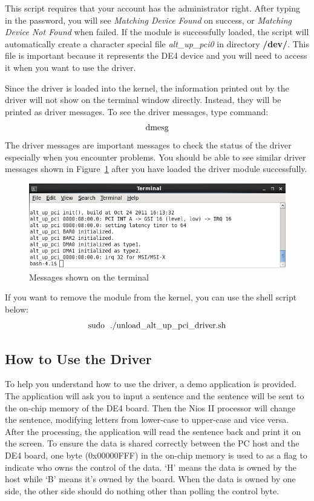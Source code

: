 \documentclass[11pt, twoside, pdftex]{article}
\begin{document}
This script requires that your account has the administrator right. After typing in the password, you will see {\it Matching Device Found} on success, or {\it Matching Device Not Found} when failed. If the module is successfully loaded, the script will automatically create a character special file {\it alt\_up\_pci0} in directory {\bf /dev/}. This file is important because it represents the DE4 device and you will need to access it when you want to use the driver.

Since the driver is loaded into the kernel, the information printed out by the driver will not show on the terminal window directly. Instead, they will be printed as driver messages. To see the driver messages, type command:
$$ {\rm dmesg} $$
The driver messages are important messages to check the status of the driver especially when you encounter problems. You should be able to see similar driver messages shown in Figure~\ref{fig:dmesg_result} after you have loaded the driver module successfully.

\begin{figure}[H]%
	\centering
		\includegraphics[scale=0.65]{figures/dmesg_result.png}%
	\caption{Messages shown on the terminal}%
	\label{fig:dmesg_result}%
\end{figure}

If you want to remove the module from the kernel, you can use the shell script below:
$$ {\rm sudo~~./unload\_alt\_up\_pci\_driver.sh} $$

\subsection{How to Use the Driver}
To help you understand how to use the driver, a demo application is provided. The application will ask you to input a sentence and the sentence will be sent to the on-chip memory of the DE4 board. Then the Nios II processor will change the sentence, modifying letters from lower-case to upper-case and vice versa. After the processing, the application will read the sentence back and print it on the screen. To ensure the data is shared correctly between the PC host and the DE4 board, one byte (0x00000FFF) in the on-chip memory is used to as a flag to indicate who owns the control of the data. `H' means the data is owned by the host while `B' means it's owned by the board. When the data is owned by one side, the other side should do nothing other than polling the control byte.
\end{document}
